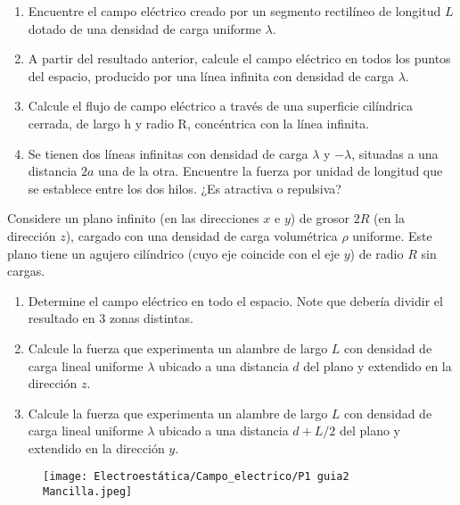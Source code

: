 \np
\begin{enumerate}[label=\alph*)]
    \item Encuentre el campo eléctrico creado por un segmento rectilíneo de longitud $L$ dotado de una densidad de carga uniforme $\lambda$.
    \item A partir del resultado anterior, calcule el campo eléctrico en todos los puntos del espacio, producido por una línea infinita con densidad de carga $\lambda$.
    \item Calcule el flujo de campo eléctrico a través de una superficie cilíndrica cerrada, de largo h y radio R, concéntrica con la línea infinita.
    \item  Se tienen dos líneas infinitas con densidad de carga $\lambda$ y $-\lambda$, situadas a una distancia $2a$ una de la otra. Encuentre la fuerza por unidad de longitud que se establece entre los dos hilos. ¿Es atractiva o repulsiva?
\end{enumerate}
\newpage
\np
Considere un plano infinito (en las direcciones $x$ e $y$) de grosor $2R$ (en la dirección $z$), cargado con una densidad de carga volumétrica $\rho$ uniforme. Este plano tiene un agujero cilíndrico (cuyo eje coincide con el eje $y$) de radio $R$ sin cargas.
\begin{enumerate}[label=\alph*)]
    \item Determine el campo eléctrico en todo el espacio. Note que debería dividir el resultado en 3 zonas distintas.
    \item Calcule la fuerza que experimenta un alambre de largo $L$ con densidad de carga lineal uniforme $\lambda$ ubicado a una distancia $d$ del plano y extendido en la dirección $z$.
    \item Calcule la fuerza que experimenta un alambre de largo $L$ con densidad de carga lineal uniforme $\lambda$ ubicado a una distancia $d+L/2$ del plano y extendido en la dirección $y$.
\end{enumerate}

\begin{figure}[h]
    \centering
    \texttt{[image: Electroestática/Campo\_electrico/P1 guia2 Mancilla.jpeg]}
    \label{fig:P1G2M}
\end{figure}

